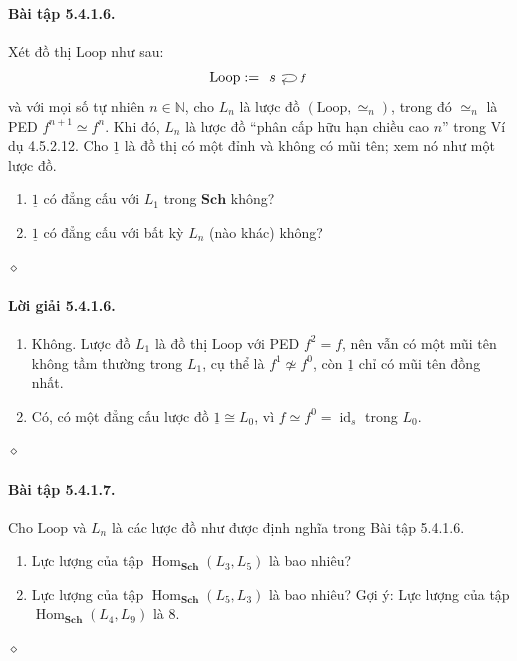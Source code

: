 \paragraph{Bài tập 5.4.1.6.} Xét đồ thị $\mathrm{Loop}$ như sau:
\[\mathrm{Loop}:=\begin{tikzcd}s\arrow[loop right,"f"]\end{tikzcd}\]
và với mọi số tự nhiên $n\in\mathbb N$, cho $L_n$ là lược đồ $(\mathrm{Loop},\simeq_n)$, trong đó $\simeq_n$ là PED $f^{n+1}\simeq f^n$. Khi đó, $L_n$ là lược đồ ``phân cấp hữu hạn chiều cao $n$'' trong Ví dụ 4.5.2.12. Cho $\underline{1}$ là đồ thị có một đỉnh và không có mũi tên; xem nó như một lược đồ.
\begin{enumerate}[label=\alph*.]\item $\underline{1}$ có đẳng cấu với $L_1$ trong $\mathbf{Sch}$ không?
\item $\underline{1}$ có đẳng cấu với bất kỳ $L_n$ (nào khác) không?\end{enumerate}\hfill$\diamond$
\paragraph{Lời giải 5.4.1.6.}
\begin{enumerate}[label=\alph*.]
\item Không. Lược đồ $L_1$ là đồ thị $\mathrm{Loop}$ với PED $f^2=f$, nên vẫn có một mũi tên không tầm thường trong $L_1$, cụ thể là $f^1\not\simeq f^0$, còn $\underline{1}$ chỉ có mũi tên đồng nhất.
\item Có, có một đẳng cấu lược đồ $\underline{1}\cong L_0$, vì $f\simeq f^0=\operatorname{id}_s$ trong $L_0$.
\end{enumerate}\hfill$\diamond$
\paragraph{Bài tập 5.4.1.7.} Cho $\mathrm{Loop}$ và $L_n$ là các lược đồ như được định nghĩa trong Bài tập 5.4.1.6.
\begin{enumerate}[label=\alph*.]\item Lực lượng của tập $\operatorname{Hom}_{\mathbf{Sch}}(L_3,L_5)$ là bao nhiêu?\item Lực lượng của tập $\operatorname{Hom}_{\mathbf{Sch}}(L_5,L_3)$ là bao nhiêu? Gợi ý: Lực lượng của tập $\operatorname{Hom}_{\mathbf{Sch}}(L_4,L_9)$ là 8.\end{enumerate}\hfill$\diamond$
